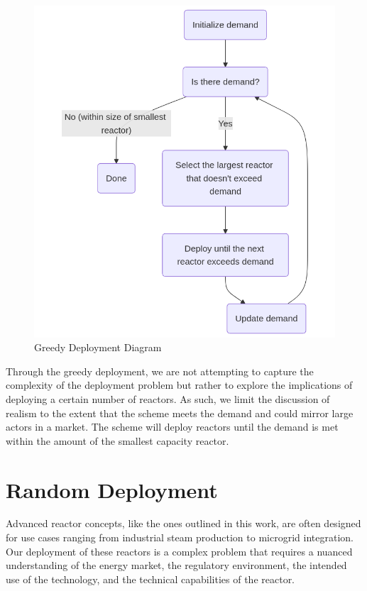 \begin{figure}[!htbp]
    \centering
    \includegraphics[scale=0.4]{images/schemes/greedy_diagram.png}
    \caption{Greedy Deployment Diagram}
    \label{fig:greedy_diagram}
\end{figure}

Through the greedy deployment, we are not attempting to capture the complexity
of the deployment problem but rather to explore the implications of deploying a
certain number of reactors. As such, we limit the discussion of realism to the
extent that the scheme meets the demand and could mirror large actors in a
market. The scheme will deploy reactors until the demand is met within the
amount of the smallest capacity reactor.



\section{Random Deployment}
\label{sec:random_deployment}

Advanced reactor concepts, like the ones outlined in this work, are often
designed for use cases ranging from industrial steam production to microgrid
integration. Our deployment of these reactors is
a complex problem that requires a nuanced understanding of the energy market,
the regulatory environment, the intended use of the technology, and the
technical capabilities of the reactor.

